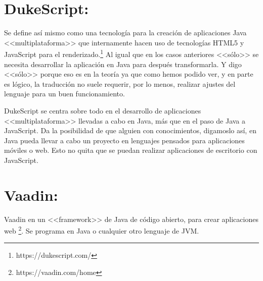 \section{DukeScript:}

Se define así mismo como una tecnología para la creación de aplicaciones Java <<multiplataforma>> que internamente hacen uso de tecnologías HTML5 y JavaScript para el renderizado.\footnote{https://dukescript.com/} 
Al igual que en los casos anteriores <<sólo>> se necesita desarrollar la aplicación en Java para después transformarla. Y digo <<sólo>> porque eso es en la teoría ya que como hemos podido ver, y en parte es lógico, la traducción no suele requerir, por lo menos, realizar ajustes del lenguaje para un buen funcionamiento.

DukeScript se centra sobre todo en el desarrollo de aplicaciones <<multiplataforma>> llevadas a cabo en Java, más que en el paso de Java a JavaScript. Da la posibilidad de que alguien con conocimientos, digamoslo así, en Java pueda llevar a cabo un proyecto en lenguajes pensados para aplicaciones móviles o web. Esto no quita que se puedan realizar aplicaciones de escritorio con JavaScript.

\section{Vaadin:}

Vaadin en un <<framework>> de Java de código abierto, para crear aplicaciones web \footnote{https://vaadin.com/home}. Se programa en Java o cualquier otro lenguaje de JVM.
